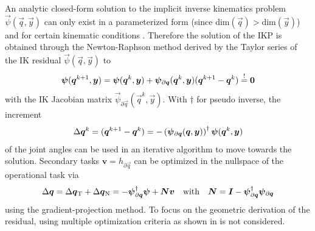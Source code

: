 \documentclass[graybox,vecphys]{svmult}
\newcommand{\bm}[1]{\boldsymbol{#1}}
\newcommand{\ResR}[0]{\vec{\psi}}
\begin{document}
An analytic closed-form solution to the implicit inverse kinematics problem $\ResR(\vec{q},\vec{y})$ can only exist in a parameterized form (since $\mathrm{dim}(\vec{q}){>}\mathrm{dim}(\vec{y})$) and for certain kinematic conditions \cite{SciaviccoSic2000}.
Therefore the solution of the IKP is obtained through the Newton-Raphson method derived by the Taylor series of the IK residual $\ResR(\vec{q},\vec{y})$ to
%
\vspace{-0.1cm}
\begin{equation}
\ResR(\vec{q}^{k+1},\vec{y}) =
\ResR(\vec{q}^{k},\vec{y})
+
\ResR_{\partial \vec{q}}(\vec{q}^k,\vec{y}) (\vec{q}^{k+1} - \vec{q}^k)
\overset{!}{=}
\vec{0}
\vspace{-0.1cm}
\end{equation}
%
with the IK Jacobian matrix $\ResR_{\partial \vec{q}}(\vec{q}^k,\vec{y})$. 
With $\dagger$ for pseudo inverse, 
the increment
%
\vspace{-0.1cm}
\begin{equation}
\Delta \vec{q}^k
=
(\vec{q}^{k+1} - \vec{q}^k)
=
- 
\left(\ResR_{\partial \vec{q}}(\vec{q},\vec{y})\right)^{\dagger}
\ResR(\vec{q}^{k},\vec{y})
\label{equ:deltaq_psi}
\vspace{-0.1cm}
\end{equation}
%
of the joint angles can be used in an iterative algorithm to move towards the solution. 
Secondary tasks $\bm{v}{=}h_{\partial\vec{q}}$ can be optimized in the nullspace of the operational task via
%
\vspace{-0.1cm}
\begin{equation}
{\Delta}\vec{q}
=
{\Delta}\vec{q}_{\mathrm{T}} + {\Delta}\vec{q}_{\mathrm{N}}
=
-\ResR_{\partial\vec{q}}^{\dagger} \ResR +  \vec{N} \bm{v}
\quad \mathrm{with} \quad
\vec{N}=\vec{I}-\ResR_{\partial\vec{q}}^{\dagger}\ResR_{\partial\vec{q}}
\label{equ:nullspace}
\vspace{-0.0cm}
\end{equation}
%
using the gradient-projection method.
To focus on the geometric derivation of the residual, using multiple optimization criteria as shown in \cite{MoeAntTeePet2016} is not considered.
\end{document}
